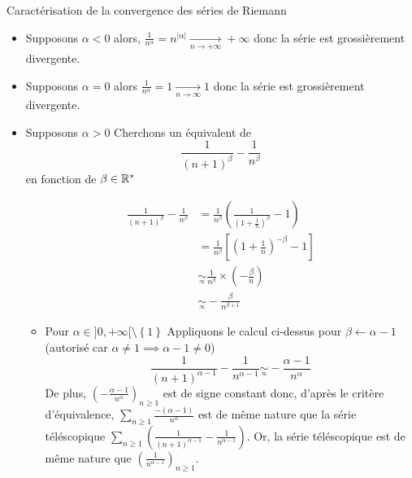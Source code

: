 \documentclass{article}
\renewenvironment{question_kholle}[2][ ]
{
	\subsection{\texorpdfstring{#2}{}}
	\notblank{#1}
	{
		\noindent #1
		\bigbreak
	}
	{}
	\begin{proof}
}
{
	\end{proof}
}
\begin{document}
\begin{question_kholle}{Caractérisation de la convergence des séries de Riemann}
    \begin{itemize}[label=$\lozenge$]
        \item Supposons $\alpha < 0$ alors, $\frac{1}{n^{\alpha}}=n^{\lvert \alpha \rvert} \xrightarrow[n\to +\infty]{}+\infty$ donc la série est grossièrement divergente.
        \item Supposons $\alpha = 0$ alors $\frac{1}{n^{\alpha}}=1 \xrightarrow[n \to \infty]{} 1$ donc la série est grossièrement divergente.
        \item Supposons $\alpha > 0$
        Cherchons un équivalent de 
$$
        \frac{1}{(n+1)^{\beta}}-\frac{1}{n^{\beta}}
$$
        en fonction de $\beta \in \mathbb R^{*}$
        
        \begin{align*}
            \frac{1}{(n+1)^{\beta}} - \frac{1}{n^{\beta}} &= 
            \frac{1}{n^{\beta}}\left( \frac{1}{\left( 1+\frac{1}{n} \right)^{\beta}} - 1 \right) \\
            &= \frac{1}{n^{\beta}}\left[ \left( 1+\frac{1}{n} \right)^{-\beta} - 1\right]  \\
            &\underset{ \overset {\infty} {} } {\sim} \frac{1}{n^{\beta}} \times \left( -\frac{\beta}{n} \right) \\
            &\underset{ \overset {\infty} {} } {\sim} - \frac{\beta}{n^{\beta+1}}
        \end{align*}
        
        \begin{itemize}[label=$\star$]
            \item Pour $\alpha \in ]0, +\infty[ \setminus \left\{ 1 \right\}$
            Appliquons le calcul ci-dessus pour $\beta \leftarrow \alpha -1$ (autorisé car $\alpha \neq 1\implies \alpha-1 \neq 0$)
            $$\frac{1}{(n+1)^{\alpha-1}}-\frac{1}{n^{\alpha-1}} \underset{ \overset {\infty} {} } {\sim}
            -\frac{\alpha-1}{n^{\alpha}}$$
            De plus, $\left( -\frac{\alpha-1}{n^{\alpha}} \right)_{n\geqslant 1}$ est de signe constant donc, d'après le critère d'équivalence, $\sum_{n\geqslant 1} \frac{-(\alpha -1)}{n^{\alpha}}$ est de même nature que la série téléscopique $\sum_{n\geqslant 1}(\frac{1}{(n+1)^{\alpha-1}}-\frac{1}{n^{\alpha-1}} )$. Or, la série téléscopique est de même nature que $\left( \frac{1}{n^{\alpha-1}} \right)_{n\geqslant 1}$.
            

\end{itemize}
\end{itemize}
\end{question_kholle}
\end{document}
